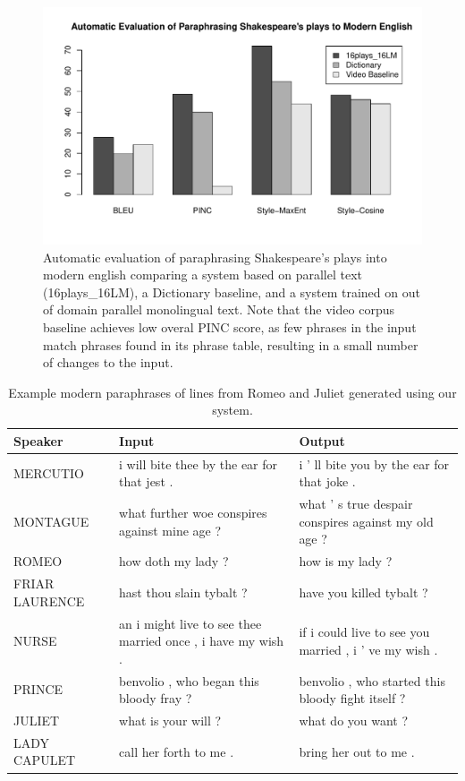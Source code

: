 \documentclass[10pt,a5paper,twoside]{article}
\begin{document}
\begin{figure}
  \includegraphics[width=5in]{figures/shakespeare_to_modern.pdf}
  \caption{Automatic evaluation of paraphrasing Shakespeare's plays into modern english comparing a system based on parallel text (16plays\_16LM), 
  a Dictionary baseline, and a system trained on out of domain parallel monolingual text.  Note that the video corpus baseline achieves low overal
  PINC score, as few phrases in the input match phrases found in its phrase table, resulting in a small number of changes to the input.}
  \label{shakespeare_to_modern_automatic}
\end{figure}

\begin{table}
  \begin{center}
  \begin{tabular}{|l|p{1.8in}|p{1.8in}|}
    \hline
    Speaker & Input & Output \\
    \hline
    \hline
    MERCUTIO & i will bite thee by the ear for that jest . & i ’ ll bite you by the ear for that joke . \\
    \hline
    MONTAGUE & what further woe conspires against mine age ? & what ’ s true despair conspires against my old age ? \\
    \hline
    ROMEO & how doth my lady ? & how is my lady ? \\
    \hline
    FRIAR LAURENCE & hast thou slain tybalt ? & have you killed tybalt ? \\
    \hline
    NURSE & an i might live to see thee married once , i have my wish . & if i could live to see you married , i ’ ve my wish . \\
    \hline
    PRINCE & benvolio , who began this bloody fray ? & benvolio , who started this bloody fight itself ? \\
    \hline
    JULIET & what is your will ? & what do you want ? \\
    \hline
    LADY CAPULET & call her forth to me . & bring her out to me . \\
    \hline
  \end{tabular}
  \end{center}
  \caption{Example modern paraphrases of lines from Romeo and Juliet generated using our system.}
  \label{modern_examples}
\end{table}
\end{document}
